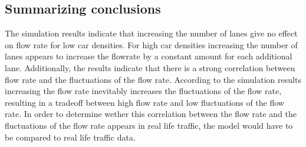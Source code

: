 \documentclass[a4paper,12pt]{article}
\begin{document}
\subsection*{Summarizing conclusions}
The simulation results indicate that increasing the number of lanes give no effect on flow rate for low car densities. For high car densities increasing the number of lanes
appears to increase the flowrate by a constant amount for each additional lane.
Additionally, the results indicate that there is a strong correlation between flow rate and the fluctuations of the flow rate. According to the simulation results increasing the flow rate
inevitably increases the fluctuations of the flow rate, resulting in a tradeoff between high flow rate and low fluctuations of the flow rate.
In order to determine wether this correlation between the flow rate and the fluctuations of the flow rate appears in real life traffic, the model would have to be compared
to real life traffic data.
\end{document}
